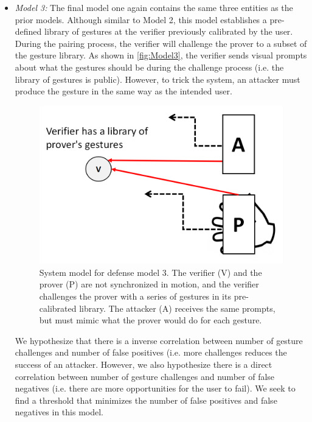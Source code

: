 \begin{itemize}
\item \emph{Model 3:} The final model one again contains the same three entities as the prior models. Although similar to Model 2, this model establishes a pre-defined library of gestures at the verifier previously calibrated by the user. During the pairing process, the verifier will challenge the prover to a subset of the gesture library. As shown in \autoref{fig:Model3}, the verifier sends visual prompts about what the gestures should be during the challenge process (i.e. the library of gestures is public). However, to trick the system, an attacker must produce the gesture in the same way as the intended user. 

\begin{figure}[!tb]
\centering
\includegraphics[width=0.65 \linewidth]{./figures/model3.png}
\caption{System model for defense model 3. The verifier (V) and the prover (P) are not synchronized in motion, and the verifier challenges the prover with a series of gestures in its pre-calibrated library. The attacker (A) receives the same prompts, but must mimic what the prover would do for each gesture.}
\label{fig:Model3}
\end{figure}

We hypothesize that there is a inverse correlation between number of gesture challenges and number of false positives (i.e. more challenges reduces the success of an attacker. However, we also hypothesize there is a direct correlation between number of gesture challenges and number of false negatives (i.e. there are more opportunities for the user to fail). We seek to find a threshold that minimizes the number of false positives and false negatives in this model.


\end{itemize}

